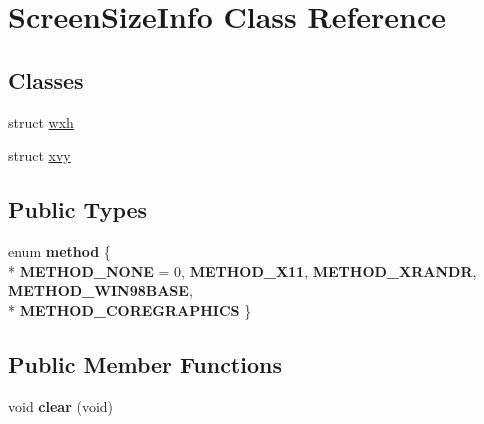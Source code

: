 \hypertarget{classScreenSizeInfo}{\section{Screen\-Size\-Info Class Reference}
\label{classScreenSizeInfo}
}
\subsection*{Classes}
\begin{DoxyCompactItemize}
\item 
struct \hyperlink{structScreenSizeInfo_1_1wxh}{wxh}
\item 
struct \hyperlink{structScreenSizeInfo_1_1xvy}{xvy}
\end{DoxyCompactItemize}
\subsection*{Public Types}
\begin{DoxyCompactItemize}
\item 
enum {\bfseries method} \{ \\*
{\bfseries M\-E\-T\-H\-O\-D\-\_\-\-N\-O\-N\-E} = 0, 
{\bfseries M\-E\-T\-H\-O\-D\-\_\-\-X11}, 
{\bfseries M\-E\-T\-H\-O\-D\-\_\-\-X\-R\-A\-N\-D\-R}, 
{\bfseries M\-E\-T\-H\-O\-D\-\_\-\-W\-I\-N98\-B\-A\-S\-E}, 
\\*
{\bfseries M\-E\-T\-H\-O\-D\-\_\-\-C\-O\-R\-E\-G\-R\-A\-P\-H\-I\-C\-S}
 \}
\end{DoxyCompactItemize}
\subsection*{Public Member Functions}
\begin{DoxyCompactItemize}
\item 
\hypertarget{classScreenSizeInfo_aa0eff309e043f47a819db7f357007a74}{void {\bfseries clear} (void)}\label{classScreenSizeInfo_aa0eff309e043f47a819db7f357007a74}

\end{DoxyCompactItemize}
